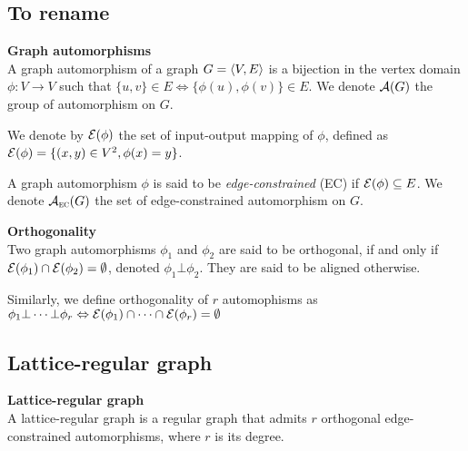 
\subsection{To rename}


\begin{definition}\textbf{Graph automorphisms}\\
A graph automorphism of a graph $G = \langle V, E \rangle$ is a bijection in the vertex domain $\phi: V \rightarrow V$ such that $\{u,v\} \in E \Leftrightarrow \{\phi(u), \phi(v)\} \in E$. We denote $\mathcal{A}(G)$ the group of automorphism on $G$.

We denote by $\mathcal{E}(\phi)$ the set of input-output mapping of $\phi$, defined as $\mathcal{E}(\phi) = \{ (x,y) \in V^2, \phi(x) = y \}$.

A graph automorphism $\phi$ is said to be \emph{edge-constrained} (EC) if $\mathcal{E}(\phi) \subseteq E$. We denote $\mathcal{A}_{\operatorname{\textsc{ec}}}(G)$ the set of edge-constrained automorphism on $G$.
\end{definition}

\begin{definition}\textbf{Orthogonality}\\
Two graph automorphisms $\phi_1$ and $\phi_2$ are said to be orthogonal, if and only if $\mathcal{E}(\phi_1) \cap \mathcal{E}(\phi_2) = \emptyset$, denoted $\phi_1 \bot \phi_2$. They are said to be aligned otherwise.

Similarly, we define orthogonality of $r$ automophisms as $\phi_1 \bot \cdots \bot \phi_r \Leftrightarrow \mathcal{E}(\phi_1) \cap \cdots \cap \mathcal{E}(\phi_r) = \emptyset$
\end{definition}


\subsection{Lattice-regular graph}

\begin{definition}\textbf{Lattice-regular graph}\\
A lattice-regular graph is a regular graph that admits $r$ orthogonal edge-constrained automorphisms, where $r$ is its degree.
\end{definition}





